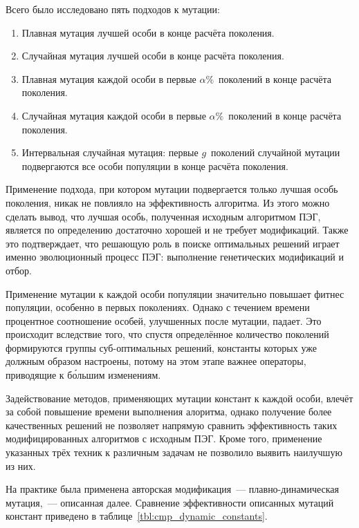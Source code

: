 Всего было исследовано пять подходов к мутации:
\begin{enumerate}
  \item Плавная мутация лучшей особи в конце расчёта поколения.
  \item Случайная мутация лучшей особи в конце расчёта поколения.
  \item Плавная мутация каждой особи в первые $\alpha\%$~поколений в конце расчёта поколения.
  \item Случайная мутация каждой особи в первые $\alpha\%$~поколений в конце расчёта поколения.
  \item Интервальная случайная мутация: первые $g$~поколений случайной мутации подвергаются все особи популяции в конце расчёта поколения.
\end{enumerate}

Применение подхода, при котором мутации подвергается только лучшая особь поколения, никак не повлияло на эффективность алгоритма. Из этого можно сделать вывод, что лучшая особь, полученная исходным алгоритмом ПЭГ, является по определению достаточно хорошей и не требует модификаций. Также это подтверждает, что решающую роль в поиске оптимальных решений играет именно эволюционный процесс ПЭГ: выполнение генетических модификаций и отбор.

Применение мутации к каждой особи популяции значительно повышает фитнес популяции, особенно в первых поколениях. Однако с течением времени процентное соотношение особей, улучшенных после мутации, падает. Это происходит вследствие того, что спустя определённое количество поколений формируются группы суб-оптимальных решений, константы которых уже должным образом настроены, потому на этом этапе важнее операторы, приводящие к б\'{о}льшим изменениям.

Задействование методов, применяющих мутации констант к каждой особи, влечёт за собой повышение времени выполнения алоритма, однако получение более качественных решений не позволяет напрямую сравнить эффективность таких модифицированных алгоритмов с исходным ПЭГ. Кроме того, применение указанных трёх техник к различным задачам не позволило выявить наилучшую из них.

На практике была применена авторская модификация~--- плавно-динамическая мутация,~--- описанная далее. Сравнение эффективности описанных мутаций констант приведено в таблице~\ref{tbl:cmp_dynamic_constants}.






